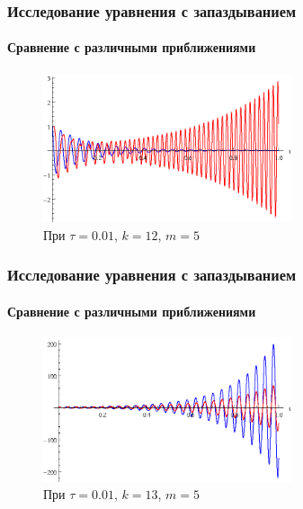 \documentclass{beamer}
\numberwithin{equation}{section}
\begin{document}
    \begin{frame}
        \frametitle{Исследование уравнения с запаздыванием}
        \framesubtitle{Сравнение с различными приближениями}

        \begin{figure}[h]
        \begin{center}
            \includegraphics[width=0.65\textwidth]{example.eps}
        \end{center}
        \caption{При $\tau=0.01$, $k=12$, $m=5$}
        \end{figure}
    \end{frame}

    \begin{frame}
        \frametitle{Исследование уравнения с запаздыванием}
        \framesubtitle{Сравнение с различными приближениями}

        \begin{figure}[h]
        \begin{center}
            \includegraphics[width=0.65\textwidth]{example_bad.eps}
        \end{center}
        \caption{При $\tau=0.01$, $k=13$, $m=5$}
        \end{figure}
    \end{frame}
\end{document}

